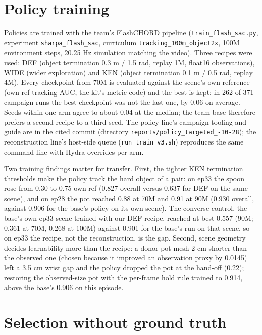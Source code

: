 \documentclass[10pt,a4paper]{article}
\newcommand{\code}[1]{\texttt{#1}}
\begin{document}
\section{Policy training}
\label{sec:policy}

Policies are trained with the team's FlashCHORD pipeline (\code{train\_flash\_sac.py}, experiment \code{sharpa\_flash\_sac}, curriculum \code{tracking\_100m\_object2x}, 100M environment steps, 20.25 Hz simulation matching the video). Three recipes were used: DEF (object termination 0.3 m / 1.5 rad, replay 1M, float16 observations), WIDE (wider exploration) and KEN (object termination 0.1 m / 0.5 rad, replay 4M). Every checkpoint from 70M is evaluated against the scene's own reference (own-ref tracking AUC, the kit's metric code) and the best is kept: in 262 of 371 campaign runs the best checkpoint was not the last one, by 0.06 on average. Seeds within one arm agree to about 0.04 at the median; the team base therefore prefers a second recipe to a third seed. The policy line's campaign tooling and guide are in the cited commit (directory \code{reports/policy\_\allowbreak targeted\_-10-28}); the reconstruction line's host-side queue (\code{run\_train\_v3.sh}) reproduces the same command line with Hydra overrides per arm.

Two training findings matter for transfer. First, the tighter KEN termination thresholds make the policy track the hard object of a pair: on ep33 the spoon rose from 0.30 to 0.75 own-ref (0.827 overall versus 0.637 for DEF on the same scene), and on ep28 the pot reached 0.88 at 70M and 0.91 at 90M (0.930 overall, against 0.906 for the base's policy on its own scene). The converse control, the base's own ep33 scene trained with our DEF recipe, reached at best 0.557 (90M; 0.361 at 70M, 0.268 at 100M) against 0.901 for the base's run on that scene, so on ep33 the recipe, not the reconstruction, is the gap. Second, scene geometry decides learnability more than the recipe: a donor pot mesh 2 cm shorter than the observed one (chosen because it improved an observation proxy by 0.0145) left a 3.5 cm wrist gap and the policy dropped the pot at the hand-off (0.22); restoring the observed-size pot with the per-frame hold rule trained to 0.914, above the base's 0.906 on this episode.

\section{Selection without ground truth}
\label{sec:select}
\end{document}
